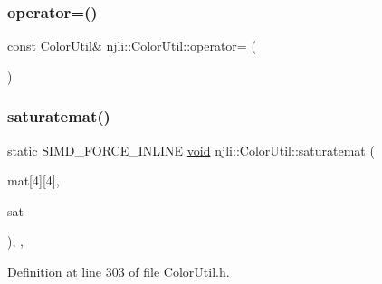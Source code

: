 \subsubsection{\texorpdfstring{operator=()}{operator=()}}
{\footnotesize\ttfamily const \mbox{\hyperlink{classnjli_1_1_color_util}{Color\+Util}}\& njli\+::\+Color\+Util\+::operator= (\begin{DoxyParamCaption}\item[{const \mbox{\hyperlink{classnjli_1_1_color_util}{Color\+Util}} \&}]{ }\end{DoxyParamCaption})\hspace{0.3cm}{\ttfamily [private]}}

\mbox{\label{classnjli_1_1_color_util_aa24bfa3faf934a7e9cb5fcb6551ada23}} 
\subsubsection{\texorpdfstring{saturatemat()}{saturatemat()}}
{\footnotesize\ttfamily static S\+I\+M\+D\+\_\+\+F\+O\+R\+C\+E\+\_\+\+I\+N\+L\+I\+NE \mbox{\hyperlink{_thread_8h_af1e856da2e658414cb2456cb6f7ebc66}{void}} njli\+::\+Color\+Util\+::saturatemat (\begin{DoxyParamCaption}\item[{double}]{mat\mbox{[}4\mbox{]}\mbox{[}4\mbox{]},  }\item[{const double}]{sat }\end{DoxyParamCaption})\hspace{0.3cm}{\ttfamily [inline]}, {\ttfamily [static]}, {\ttfamily [protected]}}



Definition at line 303 of file Color\+Util.\+h.


